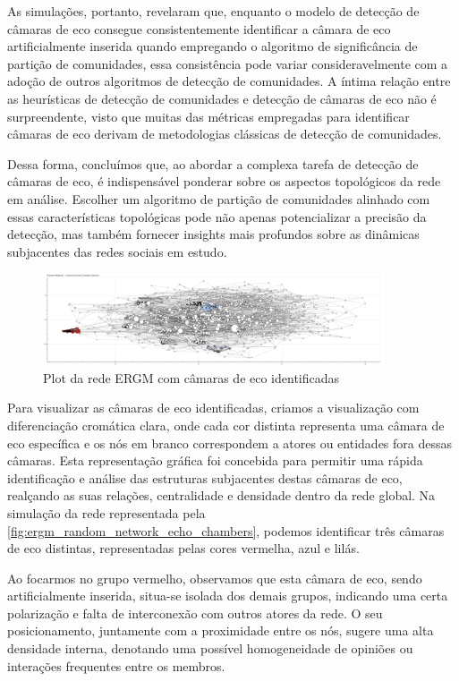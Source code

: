 As simulações, portanto, revelaram que, enquanto o modelo de detecção de câmaras de eco consegue consistentemente identificar a câmara de eco artificialmente inserida quando empregando o algoritmo de significância de partição de comunidades, essa consistência pode variar consideravelmente com a adoção de outros algoritmos de detecção de comunidades. A íntima relação entre as heurísticas de detecção de comunidades e detecção de câmaras de eco não é surpreendente, visto que muitas das métricas empregadas para identificar câmaras de eco derivam de metodologias clássicas de detecção de comunidades.

Dessa forma, concluímos que, ao abordar a complexa tarefa de detecção de câmaras de eco, é indispensável ponderar sobre os aspectos topológicos da rede em análise. Escolher um algoritmo de partição de comunidades alinhado com essas características topológicas pode não apenas potencializar a precisão da detecção, mas também fornecer insights mais profundos sobre as dinâmicas subjacentes das redes sociais em estudo.

\begin{figure}[!htb]
	\caption{Plot da rede ERGM com câmaras de eco identificadas}
	\label{fig:ergm_random_network_echo_chambers}
	\centering
	\includegraphics[width=0.9\textwidth]{images/ergm_random_network_echo_chambers.png}
	\fautor
\end{figure}

Para visualizar as câmaras de eco identificadas, criamos a visualização com diferenciação cromática clara, onde cada cor distinta representa uma câmara de eco específica e os nós em branco correspondem a atores ou entidades fora dessas câmaras. Esta representação gráfica foi concebida para permitir uma rápida identificação e análise das estruturas subjacentes destas câmaras de eco, realçando as suas relações, centralidade e densidade dentro da rede global. Na simulação da rede representada pela \autoref{fig:ergm_random_network_echo_chambers}, podemos identificar três câmaras de eco distintas, representadas pelas cores vermelha, azul e lilás.

Ao focarmos no grupo vermelho, observamos que esta câmara de eco, sendo artificialmente inserida, situa-se isolada dos demais grupos, indicando uma certa polarização e falta de interconexão com outros atores da rede. O seu posicionamento, juntamente com a proximidade entre os nós, sugere uma alta densidade interna, denotando uma possível homogeneidade de opiniões ou interações frequentes entre os membros.

